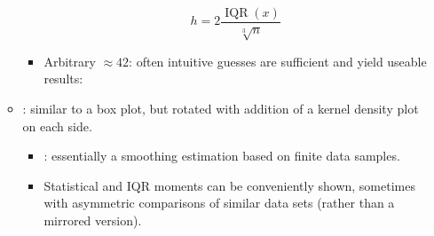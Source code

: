 \begin{itemize}
\begin{itemize}
\begin{itemize}
        \[%
        h = 2\frac{\operatorname{IQR}(x)}{\sqrt[3]{n}}
        \]%
        \item Arbitrary \(\approx42\): often intuitive guesses are sufficient and yield useable results:
      \end{itemize}
    \item {}: similar to a box plot, but rotated with addition of a kernel density plot on each side. 
      \begin{itemize}
        \item {}: essentially a smoothing estimation based on finite data samples.
        \item Statistical and IQR moments can be conveniently shown, sometimes with asymmetric comparisons of similar data sets (rather than a mirrored version).
      \end{itemize}
  \end{itemize}
  
\end{itemize}
